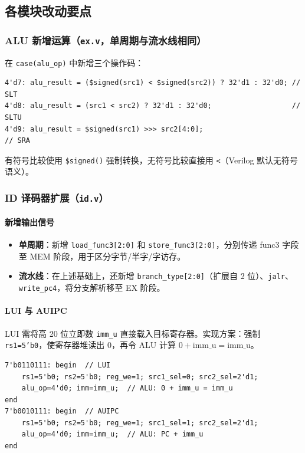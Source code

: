 \documentclass[12pt,hyperref,a4paper,UTF8]{ctexart}
\begin{document}
\subsection{各模块改动要点}

\subsubsection{ALU 新增运算（\texttt{ex.v}，单周期与流水线相同）}

在 \texttt{case(alu\_op)} 中新增三个操作码：

\begin{lstlisting}[caption={ALU 新增运算（SLT/SLTU/SRA）}]
4'd7: alu_result = ($signed(src1) < $signed(src2)) ? 32'd1 : 32'd0; // SLT
4'd8: alu_result = (src1 < src2) ? 32'd1 : 32'd0;                   // SLTU
4'd9: alu_result = $signed(src1) >>> src2[4:0];                      // SRA
\end{lstlisting}

有符号比较使用 \texttt{\$signed()} 强制转换，无符号比较直接用 \texttt{<}（Verilog 默认无符号语义）。

\subsubsection{ID 译码器扩展（\texttt{id.v}）}

\paragraph{新增输出信号}

\begin{itemize}[leftmargin=2em]
    \item \textbf{单周期}：新增 \texttt{load\_func3[2:0]} 和 \texttt{store\_func3[2:0]}，分别传递 func3 字段至 MEM 阶段，用于区分字节/半字/字访存。
    \item \textbf{流水线}：在上述基础上，还新增 \texttt{branch\_type[2:0]}（扩展自 2 位）、\texttt{jalr}、\texttt{write\_pc4}，将分支解析移至 EX 阶段。
\end{itemize}

\paragraph{LUI 与 AUIPC}

LUI 需将高 20 位立即数 \texttt{imm\_u} 直接载入目标寄存器。实现方案：强制 \texttt{rs1=5'b0}，使寄存器堆读出 0，再令 ALU 计算 $0 + \text{imm\_u} = \text{imm\_u}$。

\begin{lstlisting}[caption={LUI/AUIPC 译码（以流水线 id.v 为例）}]
7'b0110111: begin  // LUI
    rs1=5'b0; rs2=5'b0; reg_we=1; src1_sel=0; src2_sel=2'd1;
    alu_op=4'd0; imm=imm_u;  // ALU: 0 + imm_u = imm_u
end
7'b0010111: begin  // AUIPC
    rs1=5'b0; rs2=5'b0; reg_we=1; src1_sel=1; src2_sel=2'd1;
    alu_op=4'd0; imm=imm_u;  // ALU: PC + imm_u
end
\end{lstlisting}
\end{document}
